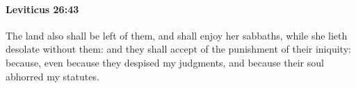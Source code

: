 
		\paragraph{Leviticus 26:43} %
			\label{LEVITICUS-26-43}

			The land also shall be left of them, and shall enjoy her sabbaths, while she lieth desolate without them: and they shall accept of the punishment of their iniquity: because, even because they despised my judgments, and because their soul abhorred my statutes.


